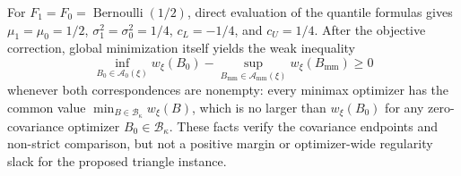 For \(F_1=F_0=\operatorname{Bernoulli}(1/2)\), direct evaluation of the quantile formulas gives \(\mu_1=\mu_0=1/2\), \(\sigma_1^2=\sigma_0^2=1/4\), \(c_L=-1/4\), and \(c_U=1/4\).  After the objective correction, global minimization itself yields the weak inequality
\[
\inf_{B_0\in\mathcal A_0(\xi)}w_\xi(B_0)-\sup_{B_{\mathrm{mm}}\in\mathcal A_{\mathrm{mm}}(\xi)}w_\xi(B_{\mathrm{mm}})\ge0
\]
whenever both correspondences are nonempty: every minimax optimizer has the common value \(\min_{B\in\mathcal B_\kappa}w_\xi(B)\), which is no larger than \(w_\xi(B_0)\) for any zero-covariance optimizer \(B_0\in\mathcal B_\kappa\).  These facts verify the covariance endpoints and non-strict comparison, but not a positive margin or optimizer-wide regularity slack for the proposed triangle instance.